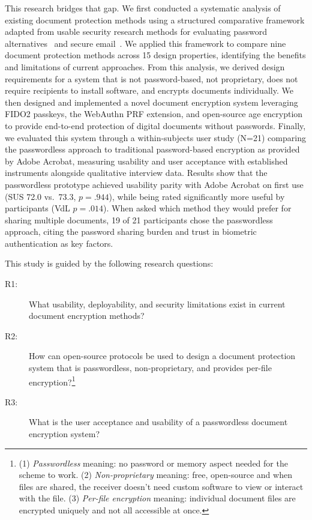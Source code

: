 This research bridges that gap. We first conducted a systematic analysis of existing document protection methods using a structured comparative framework adapted from usable security research methods for evaluating password alternatives~\cite{bonneau_quest_2012} and secure email~\cite{borisov_sok_2021}. We applied this framework to compare nine document protection methods across 15 design properties, identifying the benefits and limitations of current approaches. From this analysis, we derived design requirements for a system that is not password-based, not proprietary, does not require recipients to install software, and encrypts documents individually. We then designed and implemented a novel document encryption system leveraging FIDO2 passkeys, the WebAuthn PRF extension, and open-source age encryption to provide end-to-end protection of digital documents without passwords. Finally, we evaluated this system through a within-subjects user study (N=21) comparing the passwordless approach to traditional password-based encryption as provided by Adobe Acrobat, measuring usability and user acceptance with established instruments alongside qualitative interview data. Results show that the passwordless prototype achieved usability parity with Adobe Acrobat on first use (SUS 72.0 vs.\ 73.3, $p=.944$), while being rated significantly more useful by participants (VdL $p=.014$). When asked which method they would prefer for sharing multiple documents, 19 of 21 participants chose the passwordless approach, citing the password sharing burden and trust in biometric authentication as key factors.

This study is guided by the following research questions:

\begin{description}
    \item[R1:] What usability, deployability, and security limitations exist in current document encryption methods?
    \item[R2:] How can open-source protocols be used to design a document protection system that is passwordless, non-proprietary, and provides per-file encryption?\footnote{(1) \emph{Passwordless} meaning: no password or memory aspect needed for the scheme to work. (2) \emph{Non-proprietary} meaning: free, open-source and when files are shared, the receiver doesn't need custom software to view or interact with the file. (3) \emph{Per-file encryption} meaning: individual document files are encrypted uniquely and not all accessible at once.}
    \item[R3:] What is the user acceptance and usability of a passwordless document encryption system?
\end{description}

